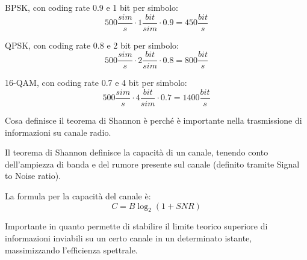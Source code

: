 \begin{questions}
\begin{solution}
        BPSK, con coding rate 0.9 e 1 bit per simbolo: 
        $$ 500 \frac{sim}{s} \cdot 1 \frac{bit}{sim} \cdot 0.9 = 450 \frac{bit}{s} $$
        
        QPSK, con coding rate 0.8 e 2 bit per simbolo: 
        $$ 500 \frac{sim}{s} \cdot 2 \frac{bit}{sim} \cdot 0.8 = 800 \frac{bit}{s} $$
        
        16-QAM, con coding rate 0.7 e 4 bit per simbolo: 
        $$ 500 \frac{sim}{s} \cdot 4 \frac{bit}{sim} \cdot 0.7 = 1400 \frac{bit}{s} $$
    \end{solution}
    
    \question Cosa definisce il teorema di Shannon è perché è importante nella trasmissione di informazioni su canale radio. 
    
    \begin{solution}
        Il teorema di Shannon definisce la capacità di un canale, tenendo conto dell'ampiezza di banda e del rumore presente sul canale (definito tramite Signal to Noise ratio).
        
        La formula per la capacità del canale è: 
        $$ C = B \log_2 (1 + SNR) $$
        
        Importante in quanto permette di stabilire il limite teorico superiore di informazioni inviabili su un certo canale in un determinato istante, massimizzando l'efficienza spettrale.
    \end{solution}
\end{questions}